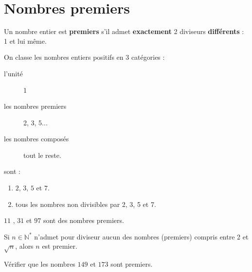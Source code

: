 \documentclass[main.tex]{subfiles}
\begin{document}
\section{Nombres premiers}
\begin{definition}
	Un nombre entier est \textbf{premiers} s'il admet \textbf{exactement} 2 diviseurs \textbf{différents} : 1 et lui même.
\end{definition}
On classe les nombres entiers positifs en 3 catégories :
\begin{description}
	\item[l'unité] 1
	\item[les nombres premiers] 2, 3, 5...
	\item[les nombres composés] tout le reste.
\end{description}
\begin{theorem}   sont :
	\begin{enumerate}[label=\textbullet, leftmargin=*]
		\item $2$, $3$, $5$ et $7$.
		\item tous les nombres non divisibles par 2, 3, 5 et 7.
	\end{enumerate}
\end{theorem}
\begin{example}
	$11$ , $31$ et $97$ sont des nombres premiers.
\end{example} 
\begin{theorem}  
	Si $n\in\mathbb{N}^*$ n'admet pour diviseur aucun des nombres (premiers) compris entre 2 et $\sqrt{n}$, alors $n$ est premier.
\end{theorem}
\begin{example}
	Vérifier que les nombres $149$ et $173$ sont premiers.
\end{example}
\end{document}
